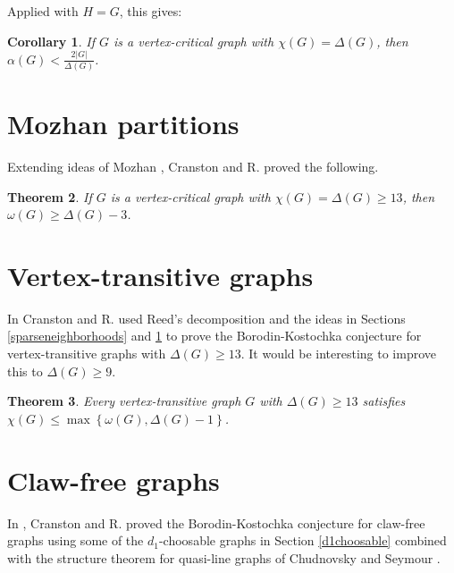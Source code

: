 \documentclass[12pt]{article}
\theoremstyle{plain}
\newtheorem{thm}{Theorem}
\newtheorem{cor}[thm]{Corollary}
\theoremstyle{definition}
\theoremstyle{remark}
\newcommand{\set}[1]{\left\{ #1 \right\}}
\newcommand{\card}[1]{\left|#1\right|}
\begin{document}
Applied with $H=G$, this gives:
\begin{cor}
If $G$ is a vertex-critical graph with $\chi(G) = \Delta(G)$, then $\alpha(G) < \frac{2\card{G}}{\Delta(G)}$.
\end{cor}

\section{Mozhan partitions}\label{shuffle}
Extending ideas of Mozhan \cite{mozhan1983}, Cranston and R. \cite{bigcliques} proved the following.
\begin{thm}
If $G$ is a vertex-critical graph with $\chi(G) = \Delta(G) \ge 13$, then $\omega(G) \ge \Delta(G) - 3$.
\end{thm}

\section{Vertex-transitive graphs}
In \cite{vertextransitive} Cranston and R. used Reed's decomposition and the ideas in Sections \ref{sparseneighborhoods} and \ref{shuffle} to prove the Borodin-Kostochka conjecture for 
vertex-transitive graphs with $\Delta(G) \ge 13$.  It would be interesting to improve this to $\Delta(G) \ge 9$.

\begin{thm}
Every vertex-transitive graph $G$ with $\Delta(G) \ge 13$ satisfies $\chi(G) \le \max\set{\omega(G), \Delta(G) - 1}$.
\end{thm}

\section{Claw-free graphs}
In \cite{cranstonrabernclaw}, Cranston and R. proved the Borodin-Kostochka conjecture for claw-free graphs using some of the $d_1$-choosable graphs in Section \ref{d1choosable} 
combined with the structure theorem for quasi-line graphs of Chudnovsky and Seymour \cite{chudnovsky2005structure}.


\end{document}
